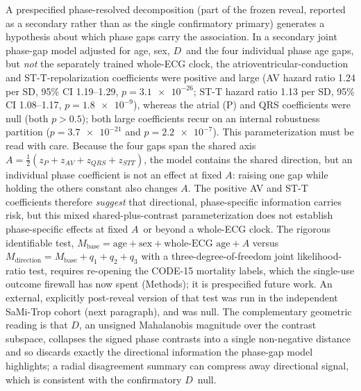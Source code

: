 \documentclass[11pt]{article}
\newcommand{\D}{\ensuremath{D}}
\newcommand{\A}{\ensuremath{A}}
\begin{document}
A prespecified phase-resolved decomposition (part of the frozen reveal, reported as a
secondary rather than as the single confirmatory primary) generates a hypothesis about
which phase gaps carry the association. In a secondary joint phase-gap model adjusted for age, sex, \D\ and the four
individual phase age gaps, but \emph{not} the separately trained whole-ECG
clock, the atrioventricular-conduction and ST-T-repolarization coefficients were positive
and large (AV hazard ratio \num{1.24} per SD, 95\% CI \numrange{1.19}{1.29},
$p=\num{3.1e-26}$; ST-T hazard ratio \num{1.13} per SD, 95\% CI \numrange{1.08}{1.17},
$p=\num{1.8e-9}$), whereas the atrial (P) and QRS coefficients were null (both
$p>\num{0.5}$); both large coefficients recur on an internal robustness partition
($p=\num{3.7e-21}$ and $p=\num{2.2e-7}$). This parameterization must be read with care.
Because the four gaps span the shared axis $\A=\tfrac12(z_P+z_{AV}+z_{QRS}+z_{STT})$, the
model contains the shared direction, but an individual phase coefficient is not an effect
at fixed \A: raising one gap while holding the others constant also changes \A. The
positive AV and ST-T coefficients therefore \emph{suggest} that directional, phase-specific
information carries risk, but this mixed shared-plus-contrast parameterization does not
establish phase-specific effects at fixed \A\ or beyond a whole-ECG clock. The rigorous
identifiable test, $M_{\text{base}}=\text{age}+\text{sex}+\text{whole-ECG age}+\A$ versus
$M_{\text{direction}}=M_{\text{base}}+q_1+q_2+q_3$ with a three-degree-of-freedom joint
likelihood-ratio test, requires re-opening the CODE-15 mortality labels, which the
single-use outcome firewall has now spent (Methods); it is prespecified future work.
An external, explicitly post-reveal version of that test was run in the independent
SaMi-Trop cohort (next paragraph), and was null. The complementary geometric
reading is that \D, an unsigned Mahalanobis magnitude over the contrast subspace, collapses
the signed phase contrasts into a single non-negative distance and so discards exactly the
directional information the phase-gap model highlights; a radial disagreement summary can
compress away directional signal, which is consistent with the confirmatory \D\ null.
\end{document}
